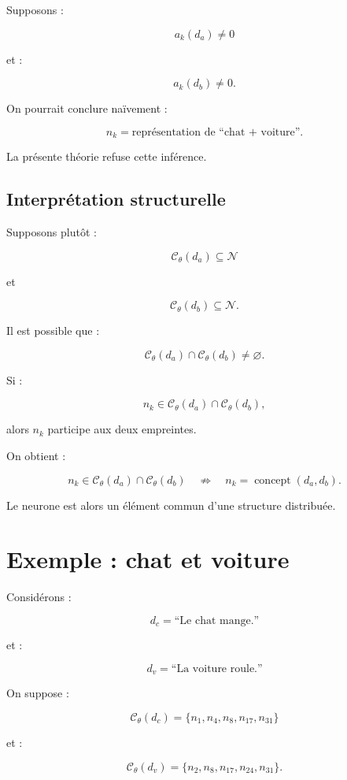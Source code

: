 \documentclass[11pt,a4paper]{article}
\begin{document}
Supposons :

\[
a_k(d_a)\neq0
\]

et :

\[
a_k(d_b)\neq0.
\]

On pourrait conclure naïvement :

\[
n_k
=
\text{représentation de ``chat + voiture''}.
\]

La présente théorie refuse cette inférence.

\subsection{Interprétation structurelle}

Supposons plutôt :

\[
\mathcal C_\theta(d_a)
\subseteq\mathcal N
\]

et

\[
\mathcal C_\theta(d_b)
\subseteq\mathcal N.
\]

Il est possible que :

\[
\mathcal C_\theta(d_a)
\cap
\mathcal C_\theta(d_b)
\neq
\varnothing.
\]

Si :

\[
n_k
\in
\mathcal C_\theta(d_a)
\cap
\mathcal C_\theta(d_b),
\]

alors $n_k$ participe aux deux empreintes.

On obtient :

\[
\boxed{
n_k\in
\mathcal C_\theta(d_a)
\cap
\mathcal C_\theta(d_b)
\quad\not\Rightarrow\quad
n_k=\operatorname{concept}(d_a,d_b).
}
\]

Le neurone est alors un élément commun d'une structure distribuée.

\section{Exemple : chat et voiture}

Considérons :

\[
d_c=\text{``Le chat mange.''}
\]

et :

\[
d_v=\text{``La voiture roule.''}
\]

On suppose :

\[
\mathcal C_\theta(d_c)
=
\{n_1,n_4,n_8,n_{17},n_{31}\}
\]

et :

\[
\mathcal C_\theta(d_v)
=
\{n_2,n_8,n_{17},n_{24},n_{31}\}.
\]
\end{document}
